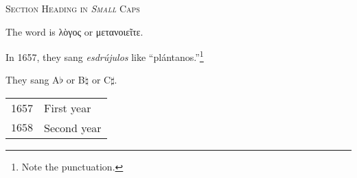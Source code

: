 \documentclass[12pt]{article}
\begin{document}
\lipsum[1]

\textsc{Section Heading in \emph{Small} Caps}

The word is \textgreek{λὸγος} or \textgreek{μετανοιεῖτε}.

In 1657, they sang \emph{esdrújulos} like ``plántanos.''\footnote{Note the punctuation.}

They sang A$\flat$ or B$\natural$ or C$\sharp$.

\begin{tabular}{rl}
1657 	& First year\\
$1658$ 	& Second year\\
\end{tabular}
\end{document}
